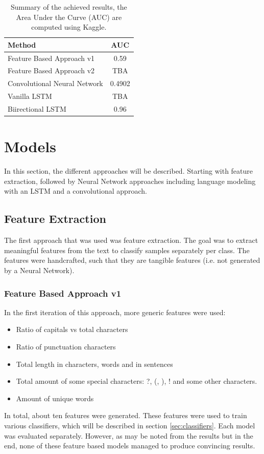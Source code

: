 \documentclass[10pt, a4paper,twocolumn]{article}
\begin{document}
	\begin{table}[t]
		\centering
		\begin{tabular}{l|c}
			\toprule
			\textbf{Method} & \textbf{AUC} \\
			\midrule
			Feature Based Approach v1 & 0.59 \\
			Feature Based Approach v2 & TBA \\
			Convolutional Neural Network & 0.4902 \\
			Vanilla LSTM & TBA \\
			Biirectional LSTM & 0.96 \\
			\bottomrule
		\end{tabular}
		\caption{Summary of the achieved results, the Area Under the Curve (AUC) are computed using Kaggle.}
		\label{table:summary_results}
	\end{table}
	
	
	\section{Models}
	In this section, the different approaches will be described. Starting with feature extraction, followed by Neural Network approaches including language modeling with an LSTM and a convolutional approach.
	
	\subsection{Feature Extraction}
	The first approach that was used was feature extraction. The goal was to extract meaningful features from the text to classify samples separately per class. The features were handcrafted, such that they are tangible features (i.e. not generated by a Neural Network).
	\subsubsection{Feature Based Approach v1}
	In the first iteration of this approach, more generic features were used:
	\begin{itemize}
		\setlength\itemsep{0px}
		\item Ratio of capitals vs total characters
		\item Ratio of punctuation characters
		\item Total length in characters, words and in sentences
		\item Total amount of some special characters: ?, (, ), ! and some other characters.
		\item Amount of unique words		
	\end{itemize}
	In total, about ten features were generated. These features were used to train various classifiers, which will be described in section \ref{sec:classifiers}. Each model was evaluated separately. However, as may be noted from the results but in the end, none of these feature based models managed to produce convincing results.
	
\end{document}
